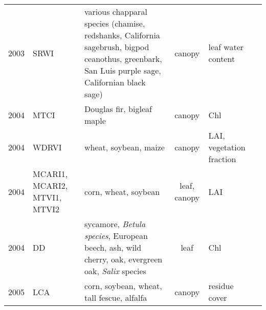 \documentclass[10pt]{article}
\begin{document}
{\begin{ThreePartTable}
\begin{longtable}{c M{1.5in} M{2.5in} c M{1.5in} M{1.5in}}
  2003 & SRWI                                            & various chapparal species (chamise, redshanks, California sagebrush, bigpod ceanothus, greenbark, San Luis purple sage, Californian black sage)                                                                                                       & canopy       & leaf water content                                                                       & \citet{Zarco-Tejada2003b}                           \\
  2004 & MTCI                                            & Douglas fir, bigleaf maple                                                                                                                                                                                                                            & canopy       & Chl                                                                                      & \citet{Dash2004}                                    \\
  2004 & WDRVI                                           & wheat, soybean, maize                                                                                                                                                                                                                                 & canopy       & LAI, vegetation fraction                                                                 & \citet{Gitelson2004}                                \\
  2004 & MCARI1, MCARI2, MTVI1, MTVI2                    & corn, wheat, soybean                                                                                                                                                                                                                                  & leaf, canopy & LAI                                                                                      & \citet{Haboudane2004}                               \\
  2004 & DD                                              & sycamore, \textit{Betula species}, European beech, ash, wild cherry, oak, evergreen oak, \textit{Salix} species                                                                                                                                       & leaf         & Chl                                                                                      & \citet{LeMaire2004}                                 \\
  2005 & LCA                                             & corn, soybean, wheat, tall fescue, alfalfa                                                                                                                                                                                                            & canopy       & residue cover                                                                            & \citet{Daughtry2005}                                \\

\end{longtable}
\end{ThreePartTable}}
\end{document}
